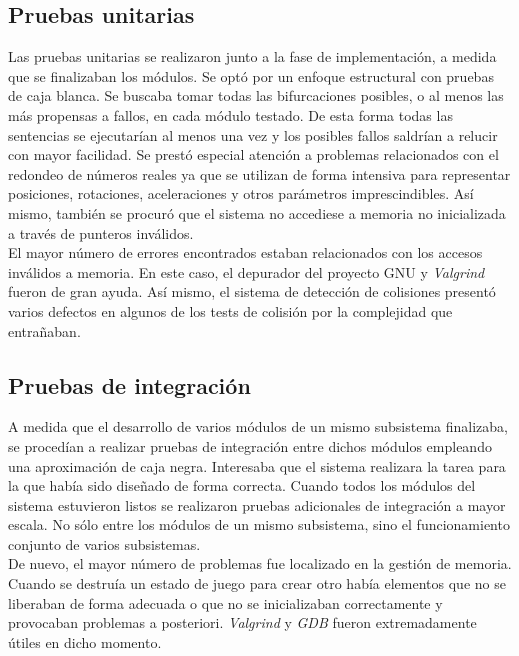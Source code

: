 \subsection{Pruebas unitarias}

Las pruebas unitarias se realizaron junto a la fase de implementación, a medida
que se finalizaban los módulos. Se optó por un enfoque estructural con pruebas
de caja blanca. Se buscaba tomar todas las bifurcaciones posibles, o al menos
las más propensas a fallos, en cada módulo testado. De esta forma todas las
sentencias se ejecutarían al menos una vez y los posibles fallos saldrían
a relucir con mayor facilidad. Se prestó especial atención a problemas
relacionados con el redondeo de números reales ya que se utilizan de forma
intensiva para representar posiciones, rotaciones, aceleraciones y otros
parámetros imprescindibles. Así mismo, también se procuró que el sistema
no accediese a memoria no inicializada a través de punteros inválidos.\\

El mayor número de errores encontrados estaban relacionados con los accesos
inválidos a memoria. En este caso, el depurador del proyecto GNU y
\textit{Valgrind} fueron de gran ayuda. Así mismo, el sistema de detección
de colisiones presentó varios defectos en algunos de los tests de colisión
por la complejidad que entrañaban.\\

\subsection{Pruebas de integración}

A medida que el desarrollo de varios módulos de un mismo subsistema finalizaba,
se procedían a realizar pruebas de integración entre dichos módulos empleando
una aproximación de caja negra. Interesaba que el sistema realizara la tarea
para la que había sido diseñado de forma correcta. Cuando todos los módulos
del sistema estuvieron listos se realizaron pruebas adicionales de integración
a mayor escala. No sólo entre los módulos de un mismo subsistema, sino el
funcionamiento conjunto de varios subsistemas.\\

De nuevo, el mayor número de problemas fue localizado en la gestión de memoria.
Cuando se destruía un estado de juego para crear otro había elementos que no
se liberaban de forma adecuada o que no se inicializaban correctamente
y provocaban problemas a posteriori. \textit{Valgrind} y \textit{GDB}
fueron extremadamente útiles en dicho momento.\\

